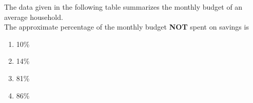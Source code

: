     \item{
	
			The data given in the following table summarizes the monthly budget of an average household. \\
			 The approximate percentage of the monthly budget \textbf{NOT} spent on savings is
			\text{   }\hfill
			
			\begin{multicols}{2}
				\begin{enumerate}
					\item 10\%
					
					\item 14\%
					 
					\item 81\%
					
					\item 86\%
				\end{enumerate}
			\end{multicols}
			
		}
  



